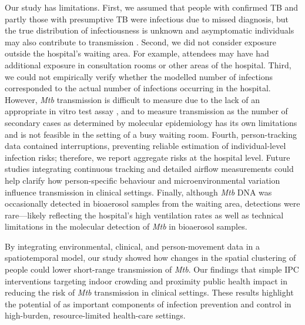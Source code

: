 \documentclass[11pt]{article}
\begin{document}
Our study has  limitations. First, we assumed that people with confirmed TB and partly those with presumptive TB were infectious due to missed diagnosis, but the true distribution of infectiousness is unknown and asymptomatic individuals may also contribute to transmission \cite{dheda2025Lancet}. \label{chg:R3.4} Second, we did not consider exposure outside the hospital's waiting area. For example, attendees may have had additional exposure in consultation rooms or other areas of the hospital. Third, we could not empirically verify whether the modelled number of infections corresponded to the actual number of infections occurring in the hospital. However, \emph{Mtb} transmission is difficult to measure due to the lack of an appropriate in vitro test assay \cite{hill2010LancetInfectDis}, and to measure transmission as the number of secondary cases as determined by molecular epidemiology has its own limitations and is not feasible in the setting of a busy waiting room. Fourth, person-tracking data contained interruptions, preventing reliable estimation of individual-level infection risks; therefore, we report aggregate risks at the hospital level. Future studies integrating continuous tracking and detailed airflow measurements could help clarify how person-specific behaviour and microenvironmental variation influence  transmission in clinical settings\label{chg:R2.29}. \label{chg:R2.4} Finally, although \emph{Mtb} DNA was occasionally detected in bioaerosol samples from the waiting area, detections were rare---likely reflecting the hospital's high ventilation rates as well as technical limitations in the molecular detection of \emph{Mtb} in bioaerosol samples.

By integrating environmental, clinical, and person-movement data in a spatiotemporal model, our study showed how changes in the spatial clustering of people could lower short-range transmission of \emph{Mtb}. Our findings  that simple IPC interventions targeting indoor crowding and proximity  public health impact in reducing the risk of \emph{Mtb} transmission in clinical settings.\label{chg:R2.1disc4} These results highlight the potential of  as important components of infection prevention and control in high-burden, resource-limited health-care settings.\label{chg:R2.30conc}
\end{document}
